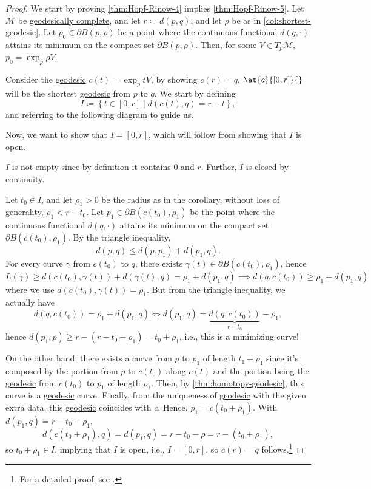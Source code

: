 \begin{proof}\let\qed\relax
	We start by proving \autoref{thm:Hopf-Rinow-4} implies \autoref{thm:Hopf-Rinow-5}. Let \(\mathcal{M} \) be \hyperref[def:geodesically-complete]{geodesically complete}, and let \(r \coloneqq d(p, q)\), and let \(\rho \) be as in \autoref{col:shortest-geodesic}. Let \(p_0 \in \partial B(p, \rho )\) be a point where the continuous functional \(d(q, \cdot)\) attains its minimum on the compact set \(\partial B(p, \rho )\). Then, for some \(V \in T_p \mathcal{M} \), \(p_0 = \exp _p \rho V\).

	Consider the \hyperref[def:geodesic]{geodesic} \(c(t) = \exp _p tV\), by showing \(c(r) = q\), \(\at{c}{[0, r]}{} \) will be the shortest \hyperref[def:geodesic]{geodesic} from \(p\) to \(q\). We start by defining
	\[
		I\coloneqq \left\{ t\in[0, r] \mid d(c(t), q) = r-t \right\},
	\]
	and referring to the following diagram to guide us.
	\begin{center}
	\end{center}

	Now, we want to show that \(I = [0, r]\), which will follow from showing that \(I\) is open.
	\begin{note}
		\(I\) is not empty since by definition it contains \(0\) and \(r\). Further, \(I\) is closed by continuity.
	\end{note}
	Let \(t_0 \in I\), and let \(\rho _1 > 0\) be the radius as in the corollary, without loss of generality, \(\rho _1 < r-t_0\). Let \(p_1\in \partial B(c(t_0), \rho _1)\) be the point where the continuous functional \(d(q, \cdot)\) attains its minimum on the compact set \(\partial B(c(t_0), \rho _1)\). By the triangle inequality,
	\[
		d(p, q) \leq d(p, p_1) + d(p_1, q).
	\]
	For every curve \(\gamma \) from \(c(t_0)\) to \(q\), there exists \(\gamma (t)\in \partial B(c(t_0), \rho _1)\), hence
	\[
		L(\gamma )
		\geq d(c(t_0), \gamma (t)) + d(\gamma (t), q)
		= \rho _1 + d(p_1, q)
		\implies d(q, c(t_0)) \geq \rho _1 + d(p_1, q)
	\]
	where we use \(d(c(t_0), \gamma (t)) = \rho _1\). But from the triangle inequality, we actually have
	\[
		d(q, c(t_0)) = \rho _1 + d(p_1, q)
		\iff d(p_1, q) = \underbrace{d(q, c(t_0))}_{r-t_0} - \rho _1,
	\]
	hence \(d(p_1, p) \geq r-(r-t_0 - \rho _1) = t_0 + \rho _1\), i.e., this is a minimizing curve!

	On the other hand, there exists a curve from \(p\) to \(p_1\) of length \(t_1 + \rho _1\) since it's composed by the portion from \(p\) to \(c(t_0)\) along \(c(t)\) and the portion being the \hyperref[def:geodesic]{geodesic} from \(c(t_0)\) to \(p_1\) of length \(\rho _1\). Then, by \autoref{thm:homotopy-geodesic}, this curve is a \hyperref[def:geodesic]{geodesic} curve. Finally, from the uniqueness of \hyperref[def:geodesic]{geodesic} with the given extra data, this \hyperref[def:geodesic]{geodesic} coincides with \(c\). Hence, \(p_1 = c ( t_0 + \rho _1)\). With \(d(p_1, q) = r-t_0 - \rho _1\),
	\[
		d(c(t_0 + \rho _1), q)
		= d(p_1, q)
		= r - t_0 - \rho
		= r-(t_0 + \rho _1),
	\]
	so \(t_0 + \rho _1\in I\), implying that \(I\) is open, i.e., \(I = [0, r]\), so \(c(r) = q\) follows.\footnote{For a detailed proof, see \cite[Corollary 3.9]{flaherty2013riemannian}.}
\end{proof}